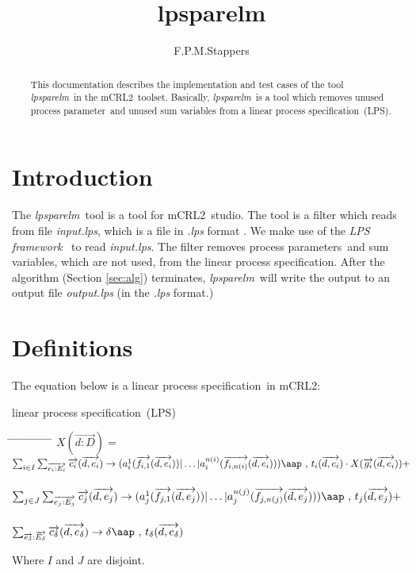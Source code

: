 \documentclass[a4paper,10pt]{article}
\title{lpsparelm}
\author{F.P.M.Stappers}
\theoremstyle{plain}
\theoremstyle{definition}
\newcommand{\mcrl}{mCRL2}
\newcommand{\lps}{linear process specification}
\newcommand{\tool}{\textit{lpsparelm}}
\newcommand{\ti}{\textit}
\newcommand{\ovr}{\overrightarrow}
\newcommand{\pp}{process parameter}
\newcommand{\pps}{process parameters}
\newcommand{\framework}{\textit{LPS framework} \cite{LPSframework}}
\newcommand{\tab}{\hspace*{5.mm} \= \hspace*{5.mm} \= \hspace*{5.mm} \= \hspace*{5.mm} \= \hspace*{5.mm} \= \hspace*{5.mm}  \= \hspace*{5.mm}  \= \hspace*{5.mm}  \= \hspace*{5.mm} \= \hspace*{5.mm} \= \hspace*{5.mm}  \= \hspace*{5.mm}  \= \hspace*{5.mm}\kill}
\newcommand{\at}[1]{\mbox{\aap ,} #1}
\begin{document}
\maketitle

\begin{abstract}
This documentation describes the implementation and test cases of the tool \tool\ in  the \mcrl\ toolset.
Basically, \tool\ is a tool which removes unused \pp\ and unused sum variables from a \lps\ (LPS).
\end{abstract}

\tableofcontents

\section{Introduction}
The \tool\ tool is a tool for \mcrl\ studio. The tool is a
filter which reads from file \ti{input.lps}, which is
a file in \ti{.lps} format \cite{LPSformat}. We make use of the
\framework\ to read \ti{input.lps}. The filter removes \pps\ and sum variables, which are not used, from the
\lps. After the algorithm (Section \ref{sec:alg}) terminates, \tool\
will write the output to an output file \ti{output.lps} (in the \ti{.lps} format.)


\section{Definitions} \label{sec:def}

The equation below is a \lps\ in \mcrl : 
\begin{defn}\lps\ (LPS) \newline
\begin{tabbing}
\tab
$X (\ovr{d: D}) = $ \> \> \> $ \sum_{i \in I} \sum_{\ovr{e_i: E_i}} \ovr{c_i} ( \ovr{d, e_i }) \rightarrow 
(a_i^1 (\ovr{f_{i,1}}(\ovr{d,e_i})) \vert \ldots \vert a_i^{n(i)}(\ovr{f_{i,n(i)}}(\ovr{d,e_i}))) \at \text{ } t_i(\ovr{d,e_i})  \cdot X(\ovr{g_i}(\ovr{d,e_i})) +$ \\ \\
\> \> \> $ \sum_{j \in J} \sum_{\ovr{e_j: E_j}} \ovr{c_j} ( \ovr{d, e_j} ) \rightarrow 
(a_j^1 (\ovr{f_{j,1}}(\ovr{d,e_j})) \vert \ldots \vert a_j^{n(j)}(\ovr{f_{j,n(j)}}(\ovr{d,e_j}))) \at \text{ } t_j(\ovr{d,e_j}) + $ \\ \\
\> \> \> $\sum_{\ovr{e_\delta}:\ovr{E_\delta}} \ovr{c_\delta} ( \ovr{d, e_\delta}) \rightarrow 
\delta \at \text{ } t_\delta(\ovr{d,e_\delta})$ 
\end{tabbing}

Where $I$ and $J$ are disjoint.\\
\end{defn}
\end{document}
